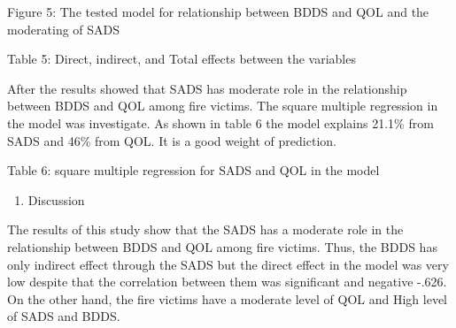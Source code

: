 \documentclass[10pt]{NSP1}
\begin{document}
Figure 5: The tested model for relationship between BDDS and QOL and the moderating of SADS

\begin{table}[htbp]
\centering
{}
\caption{}

\end{table}

Table 5: Direct, indirect, and Total effects between the variables

After the results showed that SADS has moderate role in the relationship between BDDS and QOL among fire victims. The square multiple regression in the model was investigate. As shown in table 6 the model explains 21.1\% from SADS and 46\% from QOL. It is a good weight of prediction.

\begin{table}[htbp]
\centering
{}
\caption{}

\end{table}

Table 6: square multiple regression for SADS and QOL in the model

\begin{enumerate}
  \item Discussion
\end{enumerate}

The results of this study show that the SADS has a moderate role in the relationship between BDDS and QOL among fire victims. Thus, the BDDS has only indirect effect through the SADS but the direct effect in the model was very low despite that the correlation between them was significant and negative -.626. On the other hand, the fire victims have a moderate level of QOL and High level of SADS and BDDS.
\end{document}
